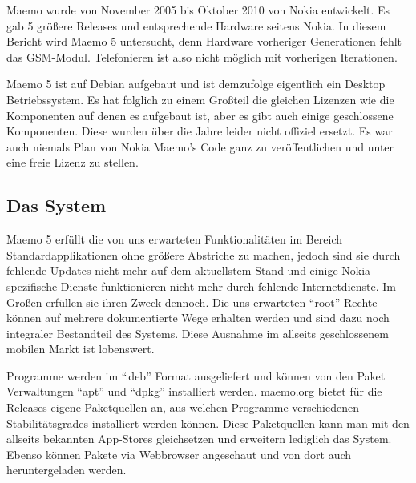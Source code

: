 Maemo wurde von November 2005\thinspace\cite{online:maemo1-770} bis Oktober 2010\thinspace\cite{online:maemo5-n900} von Nokia entwickelt. Es gab 5 größere Releases und entsprechende Hardware seitens \mbox{Nokia}\thinspace\cite{online:maemo1-770}\thinspace\cite{online:n800-specs}\thinspace\cite{online:n810-specs}\thinspace\cite{online:n900-specs}. In diesem Bericht wird Maemo 5 untersucht, denn Hardware vorheriger Generationen fehlt das GSM-Modul. Telefonieren ist also nicht möglich mit vorherigen Iterationen.

Maemo 5 ist auf Debian aufgebaut\thinspace\cite{online:maemo-about} und ist demzufolge eigentlich ein Desktop Betriebssystem. Es hat folglich zu einem Großteil die gleichen Lizenzen wie die Komponenten auf denen es aufgebaut ist, aber es gibt auch einige geschlossene Komponenten\thinspace\cite{online:maemo5-components}. Diese wurden über die Jahre leider nicht offiziel ersetzt. Es war auch niemals Plan von Nokia Maemo's Code ganz zu veröffentlichen und unter eine freie Lizenz zu stellen\thinspace\cite{online:maemo-slides}.
\newline

\subsection{Das System}
Maemo 5 erfüllt die von uns erwarteten Funktionalitäten im Bereich Standardapplikationen ohne größere Abstriche zu machen, jedoch sind sie durch fehlende Updates nicht mehr auf dem aktuellstem Stand und einige Nokia spezifische Dienste funktionieren nicht mehr durch fehlende Internetdienste. Im Großen erfüllen sie ihren Zweck dennoch. Die uns erwarteten ``root''-Rechte können auf mehrere dokumentierte Wege erhalten werden und sind dazu noch integraler Bestandteil des Systems\thinspace\cite{online:maemo-root}. Diese Ausnahme im allseits geschlossenem mobilen Markt ist lobenswert.

Programme werden im ``.deb'' Format ausgeliefert und können von den Paket Verwaltungen ``apt'' und ``dpkg'' installiert werden\thinspace\cite{online:maemo-packetinstalling}.
\mbox{maemo.org} bietet für die Releases eigene Paketquellen an, aus welchen Programme verschiedenen Stabilitätsgrades installiert werden können\thinspace\cite{online:maemo-extras}. Diese Paketquellen kann man mit den allseits bekannten \mbox{App-Stores} gleichsetzen und erweitern lediglich das System. Ebenso können Pakete via Webbrowser angeschaut und von dort auch heruntergeladen  werden\thinspace\cite{online:maemo-store}\thinspace\cite{online:maemo-rawrepos}.

